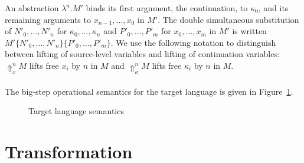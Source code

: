 \documentclass[a4paper,11pt,draft]{article}
\newcommand{\kw}[1]{\mathtt{#1}}
\begin{document}
An abstraction $\lambda^{n}.M'$ binds its first argument, the continuation,
to $\kappa_{0}$, and its remaining arguments to $x_{n-1}, \ldots, x_{0}$ in
$M'$.
The double simultaneous substitution of $N'_{0}, \ldots, N'_{n}$ for
$\kappa_{0}, \ldots, \kappa_{n}$ and $P'_{0}, \ldots, P'_{m}$ for
$x_{0}, \ldots, x_{m}$ in $M'$ is written
$M'\{N'_{0}, \ldots, N'_{n}\}\{P'_{0}, \ldots, P'_{m}\}$.
We use the following notation to distinguish between lifting of
source-level variables and lifting of continuation variables:
$\Uparrow_{x}^{n} M$ lifts free $x_{i}$ by $n$ in $M$ and
$\Uparrow_{\kappa}^{n} M$ lifts free $\kappa_{i}$ by $n$ in $M$.

\paragraph{}

The big-step operational semantics for the target language is given in
Figure~\ref{fig:targetsemantics}.

\begin{figure}
\caption{Target language semantics}
\label{fig:targetsemantics}
\end{figure}


\section{Transformation}\label{sec:transformation}
\end{document}
